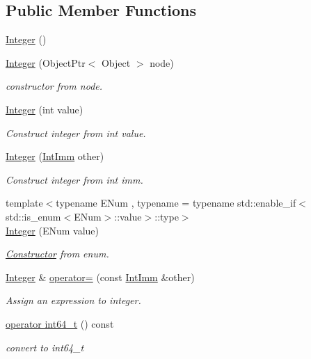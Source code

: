 \subsection*{Public Member Functions}
\begin{DoxyCompactItemize}
\item 
\hyperlink{classtvm_1_1Integer_a2d3969d98441b5b2ee5d8a986a56c410}{Integer} ()
\item 
\hyperlink{classtvm_1_1Integer_a262bc171fdf52db5f34e3c8446fb81aa}{Integer} (Object\+Ptr$<$ Object $>$ node)
\begin{DoxyCompactList}\small\item\em constructor from node. \end{DoxyCompactList}\item 
\hyperlink{classtvm_1_1Integer_a1f58cf3c6dab32f1822b9cbccb5569e8}{Integer} (int value)
\begin{DoxyCompactList}\small\item\em Construct integer from int value. \end{DoxyCompactList}\item 
\hyperlink{classtvm_1_1Integer_a962f080ada680921fbfff0846553ec33}{Integer} (\hyperlink{classtvm_1_1IntImm}{Int\+Imm} other)
\begin{DoxyCompactList}\small\item\em Construct integer from int imm. \end{DoxyCompactList}\item 
{\footnotesize template$<$typename E\+Num , typename  = typename std\+::enable\+\_\+if$<$std\+::is\+\_\+enum$<$\+E\+Num$>$\+::value$>$\+::type$>$ }\\\hyperlink{classtvm_1_1Integer_abddd0de9406285ff558cc83111ae37bd}{Integer} (E\+Num value)
\begin{DoxyCompactList}\small\item\em \hyperlink{classtvm_1_1Constructor}{Constructor} from enum. \end{DoxyCompactList}\item 
\hyperlink{classtvm_1_1Integer}{Integer} \& \hyperlink{classtvm_1_1Integer_ad538a2ae6f636b3ce38fb4162b1c2549}{operator=} (const \hyperlink{classtvm_1_1IntImm}{Int\+Imm} \&other)
\begin{DoxyCompactList}\small\item\em Assign an expression to integer. \end{DoxyCompactList}\item 
\hyperlink{classtvm_1_1Integer_ab12102b4412b34faa459408d1fc8ba0e}{operator int64\+\_\+t} () const 
\begin{DoxyCompactList}\small\item\em convert to int64\+\_\+t \end{DoxyCompactList}\end{DoxyCompactItemize}


